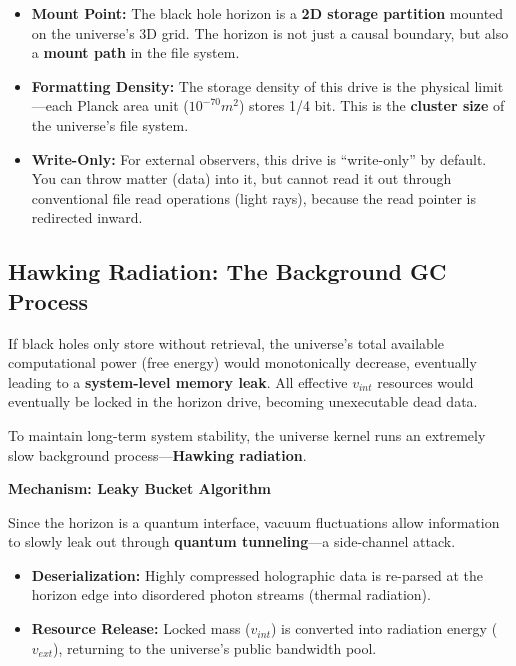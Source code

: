 \documentclass[11pt,a4paper,twoside]{book}
\begin{document}
\begin{itemize}
\item \textbf{Mount Point:} The black hole horizon is a \textbf{2D storage partition} mounted on the universe's 3D grid. The horizon is not just a causal boundary, but also a \textbf{mount path} in the file system.

\item \textbf{Formatting Density:} The storage density of this drive is the physical limit---each Planck area unit ($10^{-70} m^2$) stores 1/4 bit. This is the \textbf{cluster size} of the universe's file system.

\item \textbf{Write-Only:} For external observers, this drive is ``write-only'' by default. You can throw matter (data) into it, but cannot read it out through conventional file read operations (light rays), because the read pointer is redirected inward.
\end{itemize}

\subsection{Hawking Radiation: The Background GC Process}

If black holes only store without retrieval, the universe's total available computational power (free energy) would monotonically decrease, eventually leading to a \textbf{system-level memory leak}. All effective \textbf{$v_{int}$} resources would eventually be locked in the horizon drive, becoming unexecutable dead data.

To maintain long-term system stability, the universe kernel runs an extremely slow background process---\textbf{Hawking radiation}.

\textbf{Mechanism: Leaky Bucket Algorithm}

Since the horizon is a quantum interface, vacuum fluctuations allow information to slowly leak out through \textbf{quantum tunneling}---a side-channel attack.

\begin{itemize}
\item \textbf{Deserialization:} Highly compressed holographic data is re-parsed at the horizon edge into disordered photon streams (thermal radiation).

\item \textbf{Resource Release:} Locked mass (\textbf{$v_{int}$}) is converted into radiation energy (\textbf{$v_{ext}$}), returning to the universe's public bandwidth pool.
\end{itemize}
\end{document}

